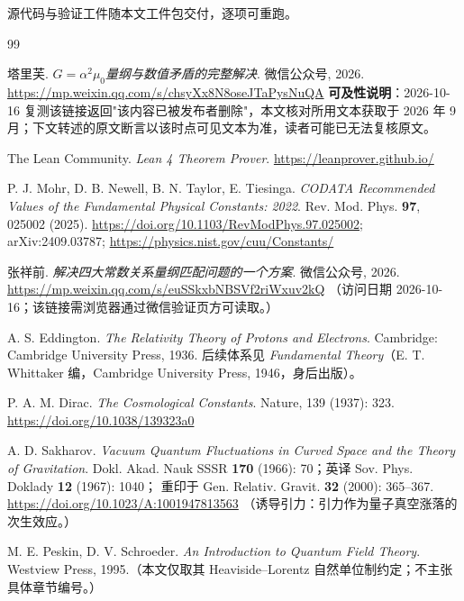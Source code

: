\documentclass[12pt,a4paper]{article}
\begin{document}
源代码与验证工件随本文工件包交付，逐项可重跑。


\begin{thebibliography}{99}

塔里芙.
\textit{$G=\alpha^2\mu_0$量纲与数值矛盾的完整解决}.
微信公众号, 2026.
\url{https://mp.weixin.qq.com/s/chsyXx8N8oseJTaPysNuQA}
\textbf{可及性说明}：2026-10-16 复测该链接返回"该内容已被发布者删除"，本文核对所用文本获取于 2026 年 9 月；下文转述的原文断言以该时点可见文本为准，读者可能已无法复核原文。

The Lean Community.
\textit{Lean 4 Theorem Prover}.
\url{https://leanprover.github.io/}

P. J. Mohr, D. B. Newell, B. N. Taylor, E. Tiesinga.
\textit{CODATA Recommended Values of the Fundamental Physical Constants: 2022}.
Rev. Mod. Phys. \textbf{97}, 025002 (2025).
\url{https://doi.org/10.1103/RevModPhys.97.025002}; arXiv:2409.03787;
\url{https://physics.nist.gov/cuu/Constants/}

张祥前.
\textit{解决四大常数关系量纲匹配问题的一个方案}.
微信公众号, 2026.
\url{https://mp.weixin.qq.com/s/euSSkxbNBSVf2riWxuv2kQ}
（访问日期 2026-10-16；该链接需浏览器通过微信验证页方可读取。）

A. S. Eddington.
\textit{The Relativity Theory of Protons and Electrons}.
Cambridge: Cambridge University Press, 1936.
后续体系见 \textit{Fundamental Theory}（E. T. Whittaker 编，Cambridge University Press, 1946，身后出版）。

P. A. M. Dirac.
\textit{The Cosmological Constants}.
Nature, 139 (1937): 323.
\url{https://doi.org/10.1038/139323a0}

A. D. Sakharov.
\textit{Vacuum Quantum Fluctuations in Curved Space and the Theory of Gravitation}.
Dokl. Akad. Nauk SSSR \textbf{170} (1966): 70；英译 Sov. Phys. Doklady \textbf{12} (1967): 1040；
重印于 Gen. Relativ. Gravit. \textbf{32} (2000): 365--367.
\url{https://doi.org/10.1023/A:1001947813563}
（诱导引力：引力作为量子真空涨落的次生效应。）

M. E. Peskin, D. V. Schroeder.
\textit{An Introduction to Quantum Field Theory}.
Westview Press, 1995.（本文仅取其 Heaviside--Lorentz 自然单位制约定；不主张具体章节编号。）


\end{thebibliography}
\end{document}
